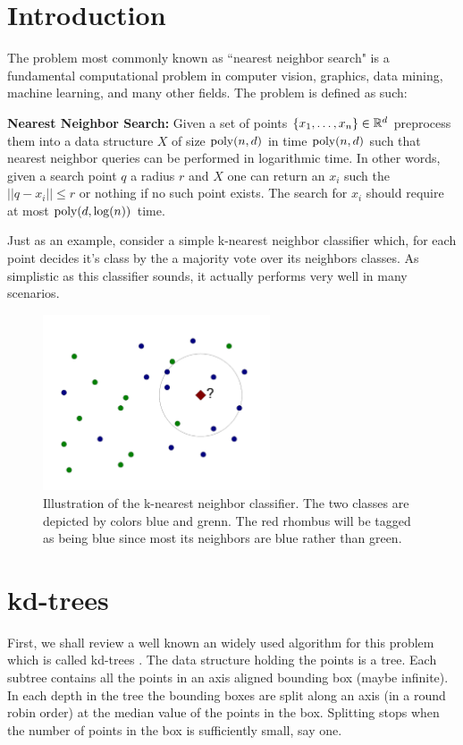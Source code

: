 \documentclass{article}
\begin{document}

\section{Introduction}
The problem most commonly known as ``nearest neighbor search" is a fundamental 
computational problem in computer vision, graphics, data mining, machine learning, and many other fields.
The problem is defined as such:
\begin{definition}{\bf Nearest Neighbor Search:} Given a set of points $\{x_1,\ldots,x_n\} \in {\mathbb{R}}^{d}$ 
preprocess them into a data structure
$X$ of size ${\operatorname{poly}}(n,d)$ in time ${\operatorname{poly}}(n,d)$ such that nearest neighbor queries can
be performed in logarithmic time. In other words, given a search point $q$ a radius $r$ and $X$ one can 
return an $x_i$ such the $||q - x_i || \le r$ or nothing if no such point exists.  The search for $x_i$ should
require at most ${\operatorname{poly}}(d,\log(n))$ time.
\end{definition}

Just as an example, consider a simple k-nearest neighbor classifier which, for each point decides it's class
by the a majority vote over its neighbors classes. As simplistic as this classifier sounds, it actually performs 
very well in many scenarios.


\begin{figure}[h!]
  \centering
  \includegraphics[width=0.6\textwidth]{10_images/knns_classifier.pdf}
  \caption{Illustration of the k-nearest neighbor classifier. The two classes are depicted by colors blue and grenn.
  The red rhombus will be tagged as being blue since most its neighbors are blue rather than green.}
\end{figure}


\section{kd-trees}
First, we shall review a well known an widely used algorithm for this problem which is called kd-trees \cite{Bentley75}.
The data structure holding the points is a tree. 
Each subtree contains all the points in an axis aligned bounding box (maybe infinite).
In each depth in the tree the bounding boxes are split along an axis (in a round robin order) at the median value of the points in the box.
Splitting stops when the number of points in the box is sufficiently small, say one. 
\end{document}

